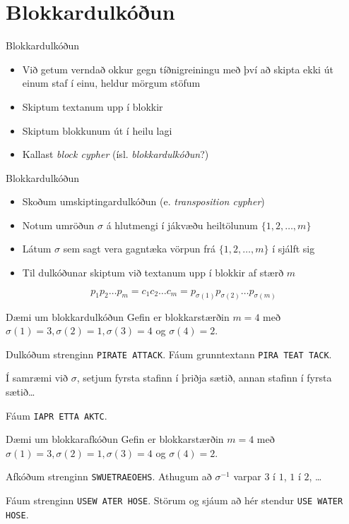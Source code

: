 \documentclass[handout]{beamer}
\begin{document}
\section{Blokkardulkóðun}

\begin{frame}{Blokkardulkóðun}
\begin{itemize}
 \item Við getum verndað okkur gegn tíðnigreiningu með því að skipta ekki út einum staf í einu, heldur mörgum stöfum
 \item Skiptum textanum upp í blokkir
 \item Skiptum blokkunum út í heilu lagi
 \item Kallast \emph{block cypher} (ísl. \emph{blokkardulkóðun}?)
\end{itemize}
\end{frame}

\begin{frame}{Blokkardulkóðun}
\begin{itemize}
 \item Skoðum umskiptingardulkóðun (e. \emph{transposition cypher})
 \item Notum umröðun $\sigma$ á hlutmengi í jákvæðu heiltölunum $\{1, 2, \ldots, m\}$
 \item Látum $\sigma$ sem sagt vera gagntæka vörpun frá $\{1, 2, \ldots, m\}$ í sjálft sig
 \item Til dulkóðunar skiptum við textanum upp í blokkir af stærð $m$
\end{itemize}
\[
 p_1p_2\ldots p_m = c_1c_2\ldots c_m = p_{\sigma(1)}p_{\sigma(2)}\ldots p_{\sigma(m)}
\]

\end{frame}

\begin{frame}{Dæmi um blokkardulkóðun}
Gefin er blokkarstærðin $m=4$ með $\sigma(1) = 3, \sigma(2) = 1, \sigma(3) = 4$ og $\sigma(4) = 2$.

Dulkóðum strenginn \texttt{PIRATE ATTACK}. Fáum grunntextann \texttt{PIRA TEAT TACK}.

Í samræmi við $\sigma$, setjum fyrsta stafinn í þriðja sætið, annan stafinn í fyrsta sætið\ldots

Fáum \texttt{IAPR ETTA AKTC}.
\end{frame}

\begin{frame}{Dæmi um blokkarafkóðun}
Gefin er blokkarstærðin $m=4$ með $\sigma(1) = 3, \sigma(2) = 1, \sigma(3) = 4$ og $\sigma(4) = 2$.

Afkóðum strenginn \texttt{SWUETRAEOEHS}. Athugum að $\sigma^{-1}$ varpar $3$ í $1$, $1$ í $2$, \ldots

Fáum strenginn \texttt{USEW ATER HOSE}. Störum og sjáum að hér stendur \texttt{USE WATER HOSE}.
\end{frame}
\end{document}
